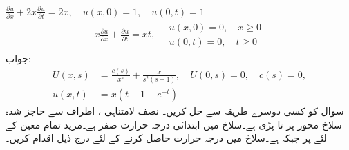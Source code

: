 \quad
$\frac{\partial u}{\partial x}+2x\frac{\partial u}{\partial t}=2x,\quad u(x,0)=1,\quad u(0,t)=1$
\quad
\begin{align*}
x\frac{\partial u}{\partial x}+\frac{\partial u}{\partial t}=xt,\quad \substack{u(x,0)=0,\quad x\ge 0\\ u(0,t)=0,\quad t\ge 0}
\end{align*}
جواب:\quad
\begin{align*}
U(x,s)&=\tfrac{c(s)}{x^s}+\tfrac{x}{s^2(s+1)},\quad U(0,s)=0,\quad c(s)=0,\\
u(x,t)&=x(t-1+e^{-t})
\end{align*}
\quad سوال  کو کسی دوسرے طریقہ سے حل کریں۔
نصف لامتناہی ، اطراف سے حاجز شدہ سلاخ  محور پر  تا  پڑی ہے۔سلاخ میں ابتدائی درجہ حرارت صفر ہے۔مزید تمام معین   کے لئے  پر  جبکہ  ہے۔سلاخ میں درجہ حرارت  حاصل کرنے کے لئے درج ذیل اقدام کریں۔

